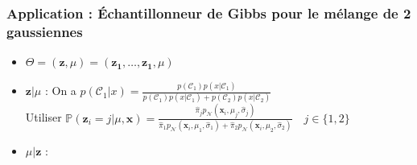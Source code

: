     \begin{frame}
        \frametitle{\small Application : \'Echantillonneur de Gibbs pour le mélange de 2 gaussiennes}
        \vspace{-0.5cm}
    \begin{itemize}
        \item $\Theta = (\boldsymbol{z}, \mu) = (\boldsymbol{z_1}, \ldots,\boldsymbol{z_1},  \mu)$
        \item \textcolor{beamerfooter3}{\Large $\boldsymbol{z} | \mu$} :  
        On a $p\left(\mathcal{C}_{1} | x\right)=\frac{p\left(\mathcal{C}_{1}\right) p\left(x | \mathcal{C}_{1}\right)}
        {p\left(\mathcal{C}_{1}\right) p\left(x | \mathcal{C}_{1}\right)+p\left(\mathcal{C}_{2}\right) p\left(x | \mathcal{C}_{2}\right)}$ 
        \\\vspace{0.2cm}
        Utiliser
        $\mathbb{P}\left(\boldsymbol{z}_{i}=j | \mu, \boldsymbol{x} \right)=
        { \displaystyle \frac{
            \hat{\pi}_{j}  p_{\mathcal{N}}(\boldsymbol{x}_i,\mu_{j}, \hat{\sigma}_{j})
            }{
                \hat{\pi}_{1}  p_{\mathcal{N}}(\boldsymbol{x}_i,\mu_{1}, \hat{\sigma}_{1})  +  
                \hat{\pi}_{2}  p_{\mathcal{N}}(\boldsymbol{x}_i,\mu_{2}, \hat{\sigma}_{2})
            }} \quad j \in \{ 1,2\}
            $             
        \item \textcolor{beamerfooter3}{\Large $\mu | \boldsymbol{z}$} :
        
        \begin{columns}[T]
            

\end{columns}
\end{itemize}
\end{frame}
